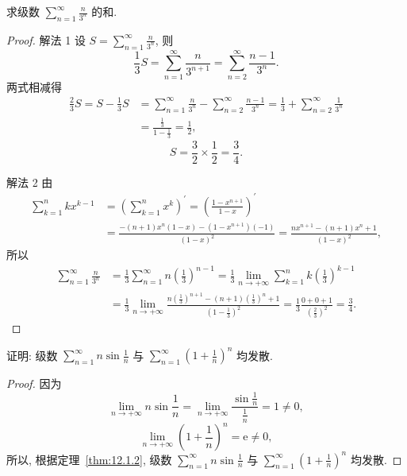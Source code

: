 \begin{example}\label{ex:12.1.4}
求级数 $\sum_{n=1}^{\infty}\frac{n}{3^{n}}$ 的和.
\end{example}

\begin{proof}
解法 1 设 $S=\sum_{n=1}^{\infty}\frac{n}{3^{n}}$, 则
\[
  \frac{1}{3}S=\sum_{n=1}^{\infty}\frac{n}{3^{n+1}}=\sum_{n=2}^{\infty}\frac{n-1}{3^{n}}.
\]
两式相减得
\begin{align*}
  \frac{2}{3}S=S-\frac{1}{3}S
  &=\sum_{n=1}^{\infty}\frac{n}{3^{n}}-\sum_{n=2}^{\infty}\frac{n-1}{3^{n}}
   =\frac{1}{3}+\sum_{n=2}^{\infty}\frac{1}{3^{n}} \\
  &=\frac{\frac{1}{3}}{1-\frac{1}{3}}=\frac{1}{2},
\end{align*}
\[
  S=\frac{3}{2}\times\frac{1}{2}=\frac{3}{4}.
\]

解法 2 由
\begin{align*}
  \sum_{k=1}^{n}kx^{k-1}
  &=\left(\sum_{k=1}^{n}x^{k}\right)^{\prime}
   =\left(\frac{1-x^{n+1}}{1-x}\right)^{\prime} \\
  &=\frac{-(n+1)x^{n}(1-x)-(1-x^{n+1})(-1)}{(1-x)^{2}}
   =\frac{nx^{n+1}-(n+1)x^{n}+1}{(1-x)^{2}},
\end{align*}
所以
\begin{align*}
  \sum_{n=1}^{\infty}\frac{n}{3^{n}}
  &=\frac{1}{3}\sum_{n=1}^{\infty}n\left(\frac{1}{3}\right)^{n-1}
   =\frac{1}{3}\lim_{n\to+\infty}\sum_{k=1}^{n}k\left(\frac{1}{3}\right)^{k-1} \\
  &=\frac{1}{3}\lim_{n\to+\infty}\frac{n\left(\frac{1}{3}\right)^{n+1}-(n+1)\left(\frac{1}{3}\right)^{n}+1}{\left(1-\frac{1}{3}\right)^{2}}
   =\frac{1}{3}\frac{0+0+1}{\left(\frac{2}{3}\right)^{2}}
   =\frac{3}{4}.
\end{align*}
\end{proof}

\begin{example}\label{ex:12.1.5}
证明: 级数 $\sum_{n=1}^{\infty}n\sin\frac{1}{n}$ 与 $\sum_{n=1}^{\infty}\left(1+\frac{1}{n}\right)^{n}$ 均发散.
\end{example}

\begin{proof}
因为
\[
  \lim_{n\to+\infty}n\sin\frac{1}{n}=\lim_{n\to+\infty}\frac{\sin\frac{1}{n}}{\frac{1}{n}}=1\neq0,
\]
\[
  \lim_{n\to+\infty}\left(1+\frac{1}{n}\right)^{n}=\mathrm{e}\neq0,
\]
所以, 根据定理~\ref{thm:12.1.2}, 级数 $\sum_{n=1}^{\infty}n\sin\frac{1}{n}$ 与 $\sum_{n=1}^{\infty}\left(1+\frac{1}{n}\right)^{n}$ 均发散.
\end{proof}

